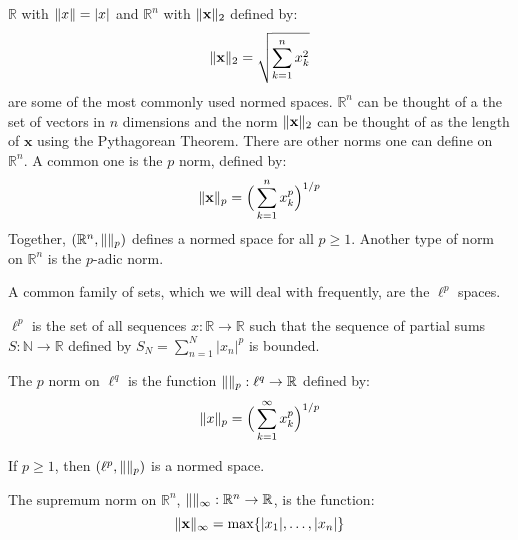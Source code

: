         \begin{example}
            $\mathbb{R}$ with $\lVert x\rVert=|x|$ and
            $\mathbb{R}^{n}$ with $\lVert\mathbf{x}\rVert_{2}$
            defined by:
            \begin{equation*}
                \lVert\mathbf{x}\rVert_{2}
                =\sqrt{\sum_{k=1}^{n}x_{k}^{2}}
            \end{equation*}
            are some of the most commonly used normed spaces.
            $\mathbb{R}^{n}$ can be thought of a the set
            of vectors in $n$ dimensions and the norm
            $\lVert\mathbf{x}\rVert_{2}$ can be thought of as
            the length of $\mathbf{x}$ using the
            Pythagorean Theorem. There are other norms one
            can define on $\mathbb{R}^{n}$. A common
            one is the $p$ norm, defined by:
            \begin{equation*}
                \lVert\mathbf{x}\rVert_{p}
                =\Big(\sum_{k=1}^{n}x_{k}^{p}\Big)^{1/p}
            \end{equation*}
            Together, $(\mathbb{R}^{n},\lVert\rVert_{p})$ defines
            a normed space for all $p\geq{1}$. Another type
            of norm on $\mathbb{R}^{n}$ is the
            $p\textrm{-adic}$ norm.
        \end{example}
        A common family of sets,
        which we will deal with frequently, are the
        $\ell^{p}$ spaces.
        \begin{definition}
            $\ell^{p}$ is the set of all sequences
            $x:\mathbb{R}\rightarrow\mathbb{R}$ such that
            the sequence of partial sums
            $S:\mathbb{N}\rightarrow\mathbb{R}$ defined by
            $S_{N}=\sum_{n=1}^{N}|x_{n}|^{p}$ is bounded.
        \end{definition}
        \begin{definition}
            The $p$ norm on $\ell^{q}$ is the function
            $\lVert\rVert_{p}:\ell^{q}\rightarrow\mathbb{R}$
            defined by:
            \begin{equation*}
                \lVert x\rVert_{p}
                =\Big(\sum_{k=1}^{\infty}x_{k}^{p}\Big)^{1/p}
            \end{equation*}
        \end{definition}
        \begin{theorem}
            If $p\geq{1}$, then $(\ell^{p},\lVert\rVert_{p})$
            is a normed space.
        \end{theorem}
        \begin{definition}
            The supremum norm on $\mathbb{R}^{n}$,
            $\norm{}_{\infty}:%
             \mathbb{R}^{n}\rightarrow\mathbb{R}$,
            is the function:
            \begin{equation*}
                \lVert\mathbf{x}\rVert_{\infty}
                =\max\{|x_{1}|,\hdots,|x_{n}|\}
            \end{equation*}
        \end{definition}

